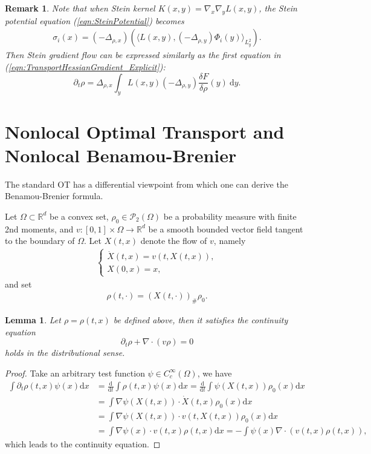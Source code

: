 \documentclass[11pt]{book}
\newtheorem{lemma}[theorem]{Lemma}
\newtheorem{remark}[theorem]{Remark}
\begin{document}
\begin{remark}
Note that when Stein kernel $K(x,y) = \nabla_x\nabla_y L(x,y)$, the Stein potential equation (\ref{eqn:SteinPotential}) becomes
\begin{align*}
\sigma_i(x) = (-\Delta_{\rho,x})\left( \Big\langle  L(x,y), (-\Delta_{\rho,y})\Phi_i(y) \Big\rangle_{L^2_{y}} \right).
\end{align*}
Then Stein gradient flow can be expressed similarly as the first equation in (\ref{eqn:TransportHessianGradient_Explicit}):
\[
\partial_t\rho = \Delta_{\rho,x}\int_y L(x,y) (-\Delta_{\rho,y}) \frac{\delta F}{\delta \rho}(y) \ \text{d}y.
\]
\end{remark}





\section[Nonlocal OT and BB]{Nonlocal Optimal Transport and Nonlocal Benamou-Brenier}



The standard OT has a differential viewpoint from which one can derive the Benamou-Brenier formula. 

Let $\Omega\subset\mathbb{R}^d$ be a convex set, $\rho_0\in\mathcal{P}_2(\Omega)$ be a probability measure with finite 2nd moments, and $v: [0,1]\times\Omega \rightarrow \mathbb{R}^d$ be a smooth bounded vector field tangent to the boundary of $\Omega$. Let $X(t,x)$ denote the flow of $v$, namely
\begin{align}\label{eqn:X_eqn}
\begin{cases}
\dot{X}(t,x) = v(t,X(t,x)), \\
X(0,x) = x,
\end{cases}
\end{align}
and set
\begin{align}\label{eqn:rho_construction}
\rho(t,\cdot) = (X(t,\cdot))_{\#} \rho_0.
\end{align}


\begin{lemma}
Let $\rho = \rho(t,x)$ be defined above, then it satisfies the continuity equation
\[
\partial_t \rho + \nabla\cdot(v\rho) = 0
\]
holds in the distributional sense.
\end{lemma}
\begin{proof}
Take an arbitrary test function $\psi \in C_c^{\infty}(\Omega)$, we have
\begin{align*}
\int \partial_t\rho(t,x)\psi(x)\text{d}x &= \frac{\text{d}}{\text{d}t} \int \rho(t,x)\psi(x) \text{d}x = \frac{\text{d}}{\text{d}t} \int \psi(X(t,x)) \rho_0(x) \text{d}x \\
&= \int \nabla\psi(X(t,x))\cdot\dot{X}(t,x)\rho_0(x)\text{d}x \\
& = \int \nabla\psi(X(t,x))\cdot v(t, X(t,x))\rho_0(x)\text{d}x \\
& = \int \nabla\psi(x)\cdot v(t, x)\rho(t,x)\text{d}x = - \int \psi(x)\nabla\cdot(v(t,x)\rho(t,x)),
\end{align*}
which leads to the continuity equation.
\end{proof}
\end{document}

